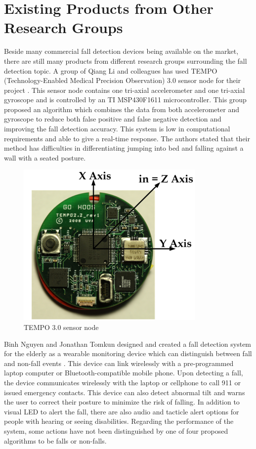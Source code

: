 \documentclass[letterpaper,12pt,titlepage,oneside,final]{book}
\begin{document}
\section{Existing Products from Other Research Groups}
Beside many commercial fall detection devices being available on the market, there are still many products from different research groups surrounding the fall detection topic. A group of Qiang Li and colleagues has used TEMPO (Technology-Enabled Medical Precision Observation) 3.0 sensor node for their project \cite{li}. This sensor node contains one tri-axial accelerometer and one tri-axial gyroscope and is controlled by an TI MSP430F1611 microcontroller. This group proposed an algorithm which combines the data from both accelerometer and gyroscope to reduce both false positive and false negative detection and improving the fall detection accuracy. This system is low in computational requirements and able to give a real-time response. The authors stated that their method has difficulties in differentiating jumping into bed and falling against a wall with a seated posture. 

 \begin{figure}[h!]
	\centering
	\includegraphics[scale=0.8]{tempo}
	\caption{TEMPO 3.0 sensor node \cite{li}}
\end{figure}

Binh Nguyen and Jonathan Tomkun designed and created a fall detection system for the elderly as a wearable monitoring device which can distinguish between fall and non-fall events  \cite{binh}. This device can link wirelessly with a pre-programmed laptop computer or Bluetooth-compatible mobile phone. Upon detecting a fall, the device communicates wirelessly with the laptop or cellphone to call 911 or issued emergency contacts. This device can also detect abnormal tilt and warns the user to correct their posture to minimize the risk of falling. In addition to visual LED to alert the fall, there are also audio and tacticle alert options for people with hearing or seeing disabilities. Regarding the performance of the system, some actions have not been distinguished by one of four proposed algorithms to be falls or non-falls. 
\end{document}
